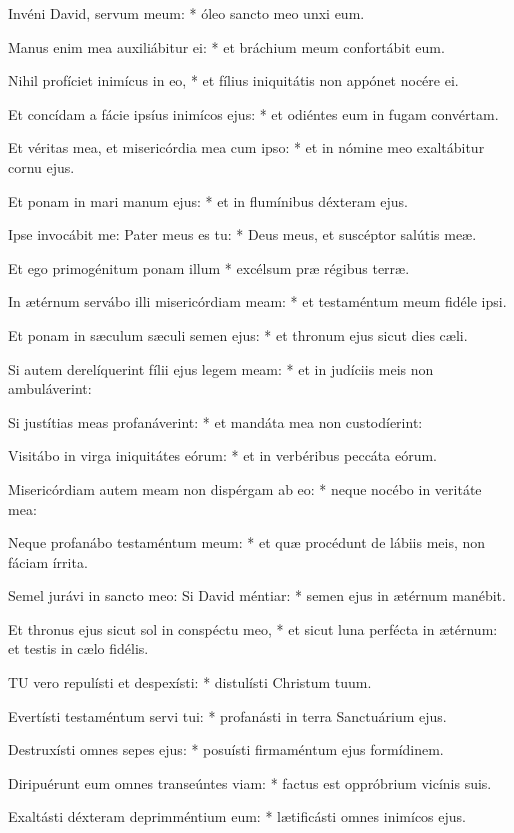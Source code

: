 Invéni David, servum meum: * óleo sancto meo unxi eum.

Manus enim mea auxiliábitur ei: * et bráchium meum confortábit eum.

Nihil profíciet inimícus in eo, * et fílius iniquitátis non appónet nocére ei.

Et concídam a fácie ipsíus inimícos ejus: * et odiéntes eum in fugam convértam.

Et véritas mea, et misericórdia mea cum ipso: * et in nómine meo exaltábitur cornu ejus.

Et ponam in mari manum ejus: * et in flumínibus déxteram ejus.

Ipse invocábit me: Pater meus es tu: * Deus meus, et suscéptor salútis meæ.

Et ego primogénitum ponam illum * excélsum præ régibus terræ.

In ætérnum servábo illi misericórdiam meam: * et testaméntum meum fidéle ipsi.

Et ponam in sæculum sæculi semen ejus: * et thronum ejus sicut dies cæli.

Si autem derelíquerint fílii ejus legem meam: * et in judíciis meis non ambuláverint:

Si justítias meas profanáverint: * et mandáta mea non custodíerint:

Visitábo in virga iniquitátes eórum: * et in verbéribus peccáta eórum.

Misericórdiam autem meam non dispérgam ab eo: * neque nocébo in veritáte mea:

Neque profanábo testaméntum meum: * et quæ procédunt de lábiis meis, non fáciam írrita.

Semel jurávi in sancto meo: Si David méntiar: * semen ejus in ætérnum manébit.

Et thronus ejus sicut sol in conspéctu meo, * et sicut luna perfécta in ætérnum: et testis in cælo fidélis.


\lettrine[lines=2]{T}{U} vero repulísti et despexísti: * distulísti Christum tuum.

Evertísti testaméntum servi tui: * profanásti in terra Sanctuárium ejus.

Destruxísti omnes sepes ejus: * posuísti firmaméntum ejus formídinem.

Diripuérunt eum omnes transeúntes viam: * factus est oppróbrium vicínis suis.

Exaltásti déxteram deprimméntium eum: * lætificásti omnes inimícos ejus.

